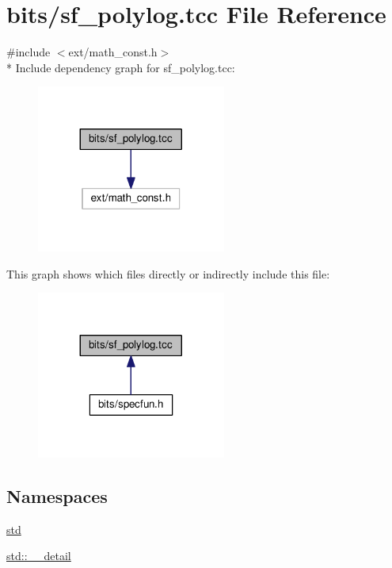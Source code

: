 \hypertarget{sf__polylog_8tcc}{}\section{bits/sf\+\_\+polylog.tcc File Reference}
\label{sf__polylog_8tcc}
{\ttfamily \#include $<$ext/math\+\_\+const.\+h$>$}\\*
Include dependency graph for sf\+\_\+polylog.\+tcc\+:
\nopagebreak
\begin{figure}[H]
\begin{center}
\leavevmode
\includegraphics[width=176pt]{sf__polylog_8tcc__incl}
\end{center}
\end{figure}
This graph shows which files directly or indirectly include this file\+:
\nopagebreak
\begin{figure}[H]
\begin{center}
\leavevmode
\includegraphics[width=176pt]{sf__polylog_8tcc__dep__incl}
\end{center}
\end{figure}
\subsection*{Namespaces}
\begin{DoxyCompactItemize}
\item 
 \hyperlink{namespacestd}{std}
\item 
 \hyperlink{namespacestd_1_1____detail}{std\+::\+\_\+\+\_\+detail}
\end{DoxyCompactItemize}
